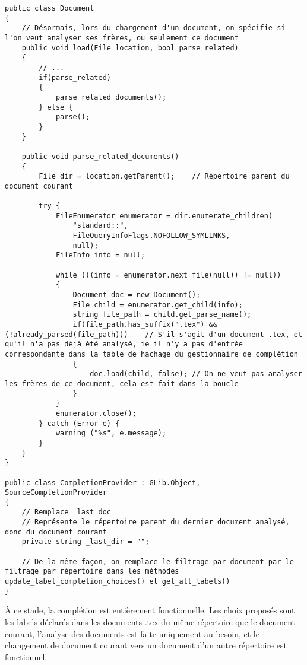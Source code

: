 \documentclass[a4paper,11pt]{report}
\begin{document}
\begin{lstlisting}[frame=single]
public class Document
{
    // Désormais, lors du chargement d'un document, on spécifie si l'on veut analyser ses frères, ou seulement ce document
    public void load(File location, bool parse_related)
    {
        // ...
        if(parse_related)
        {
            parse_related_documents();
        } else {
            parse();
        }
    }
    
    public void parse_related_documents()
    {
        File dir = location.getParent();    // Répertoire parent du document courant
        
        try {
            FileEnumerator enumerator = dir.enumerate_children(
                "standard::",
                FileQueryInfoFlags.NOFOLLOW_SYMLINKS,
                null);
            FileInfo info = null;
            
            while (((info = enumerator.next_file(null)) != null))
            {
                Document doc = new Document();
                File child = enumerator.get_child(info);
                string file_path = child.get_parse_name();
                if(file_path.has_suffix(".tex") && (!already_parsed(file_path)))    // S'il s'agit d'un document .tex, et qu'il n'a pas déjà été analysé, ie il n'y a pas d'entrée correspondante dans la table de hachage du gestionnaire de complétion
                {
                    doc.load(child, false); // On ne veut pas analyser les frères de ce document, cela est fait dans la boucle
                }
            }
            enumerator.close();
        } catch (Error e) {
            warning ("%s", e.message);
        }
    }
}

public class CompletionProvider : GLib.Object, SourceCompletionProvider
{
    // Remplace _last_doc
    // Représente le répertoire parent du dernier document analysé, donc du document courant
    private string _last_dir = "";
    
    // De la même façon, on remplace le filtrage par document par le filtrage par répertoire dans les méthodes update_label_completion_choices() et get_all_labels()
}
\end{lstlisting}

À ce stade, la complétion est entièrement fonctionnelle. Les choix proposés sont les labels déclarés dans les documents .tex du même répertoire que le document courant, l'analyse des documents est faite uniquement au besoin, et le changement de document courant vers un document d'un autre répertoire est fonctionnel.
\end{document}
